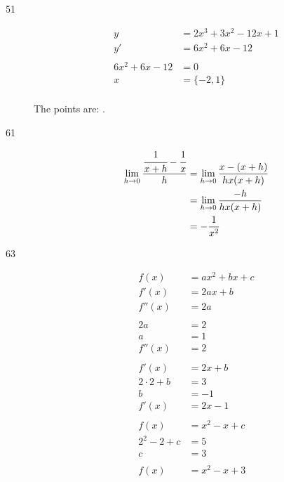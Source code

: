 \documentclass[letterpaper]{exam}
\begin{document}
\begin{description}
\begin{enumerate}[(a)]
      \end{enumerate}

    \item[51]
      \begin{align*}
        y              & = 2x^3 + 3x^2 - 12x + 1 \\
        y'             & = 6x^2 + 6x - 12 \\
        \\
        6x^2 + 6x - 12 & = 0 \\
        x              & = \{ -2, 1 \} \\
      \end{align*}

      The points are: .

    \item[61]
      \begin{align*}
        \lim_{h \to 0} \frac{\cfrac{1}{x + h} - \cfrac{1}{x}}{h} & = \lim_{h \to 0} \frac{x - (x + h)}{hx(x + h)} \\
                                                                 & = \lim_{h \to 0} \frac{-h}{hx(x + h)} \\
                                                                 & = - \frac{1}{x^2} \\
      \end{align*}

    \item[63]
      \begin{align*}
        f(x)          & = ax^2 + bx + c \\
        f'(x)         & = 2ax + b \\
        f''(x)        & = 2a \\
        \\
        2a            & = 2 \\
        a             & = 1 \\
        f''(x)        &= 2 \\
        \\
        f'(x)         & = 2x + b \\
        2 \cdot 2 + b & = 3 \\
        b             & = -1 \\
        f'(x)         & = 2x - 1 \\
        \\
        f(x)          & = x^2 - x + c \\
        2^2 - 2 + c   & = 5 \\
        c             & = 3 \\
        \\
        f(x)          & = \boxed{ x^2 - x + 3 } \\
      \end{align*}
   \end{description}
 
\end{document}
